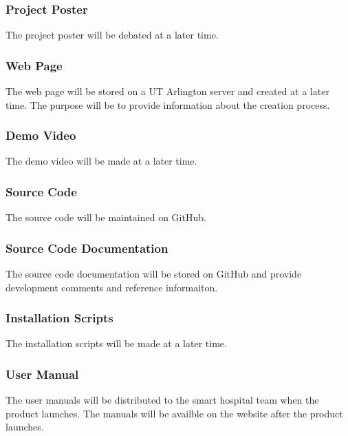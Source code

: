 \subsubsection{Project Poster}
The project poster will be debated at a later time.

\subsubsection{Web Page}
The web page will be stored on a UT Arlington server and created at a later time. The purpose will be to provide information about the creation process.

\subsubsection{Demo Video}
The demo video will be made at a later time.

\subsubsection{Source Code}
The source code will be maintained on GitHub.

\subsubsection{Source Code Documentation}
The source code documentation will be stored on GitHub and provide development comments and reference informaiton.

\subsubsection{Installation Scripts}
The installation scripts will be made at a later time.

\subsubsection{User Manual}
The user manuals will be distributed to the smart hospital team when the product launches. The manuals will be availble on the website after the product launches.